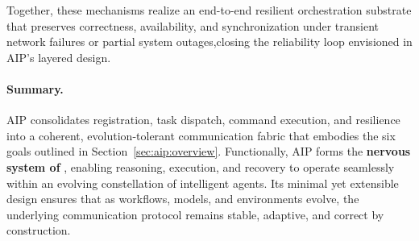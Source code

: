 Together, these mechanisms realize an end-to-end resilient orchestration substrate that preserves correctness, availability, and synchronization under transient network failures or partial system outages,closing the reliability loop envisioned in AIP's layered design.

\paragraph{Summary.}
AIP consolidates registration, task dispatch, command execution, and resilience into a coherent, evolution-tolerant communication fabric that embodies the six goals outlined in Section~\ref{sec:aip:overview}. Functionally, AIP forms the \textbf{nervous system of \ufo}, enabling reasoning, execution, and recovery to operate seamlessly within an evolving constellation of intelligent agents. Its minimal yet extensible design ensures that as workflows, models, and environments evolve, the underlying communication protocol remains stable, adaptive, and correct by construction.
